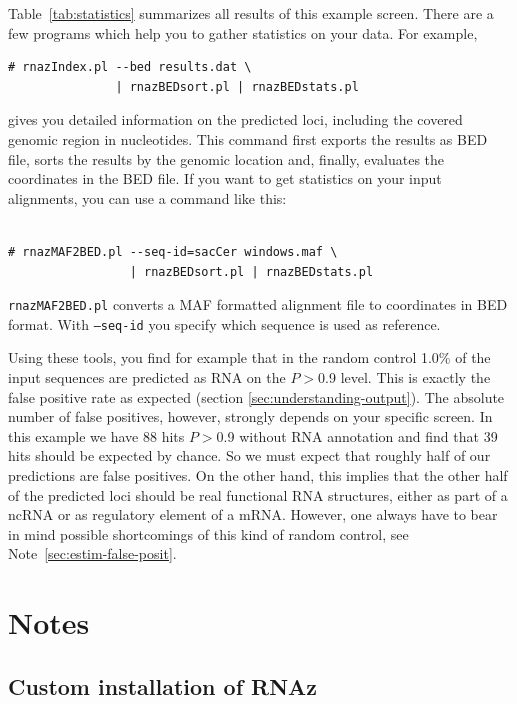\documentclass[11pt]{article}
\begin{document}
Table~\ref{tab:statistics} summarizes all results of this example screen.
There are a few programs which help you to gather statistics on your data.
For example,

\begin{verbatim}
# rnazIndex.pl --bed results.dat \
               | rnazBEDsort.pl | rnazBEDstats.pl
\end{verbatim}

gives you detailed information on the predicted loci, including the covered
genomic region in nucleotides. This command first exports the results as
BED file, sorts the results by the genomic location and, finally, evaluates
the coordinates in the BED file. If you want to get statistics on your
input alignments, you can use a command like this:

\begin{verbatim}

# rnazMAF2BED.pl --seq-id=sacCer windows.maf \
                 | rnazBEDsort.pl | rnazBEDstats.pl

\end{verbatim}

\texttt{rnazMAF2BED.pl} converts a MAF formatted alignment file to
coordinates in BED format. With \texttt{--seq-id} you specify which
sequence is used as reference.

Using these tools, you find for example that in the random control 1.0\% of
the input sequences are predicted as RNA on the $P>$0.9 level. This is
exactly the false positive rate as expected (section
\ref{sec:understanding-output}). The absolute number of false positives,
however, strongly depends on your specific screen. In this example we have
88 hits $P>$0.9 without RNA annotation and find that 39 hits should be
expected by chance. So we must expect that roughly half of our predictions
are false positives. On the other hand, this implies that the other half of
the predicted loci should be real functional RNA structures, either as part
of a ncRNA or as regulatory element of a mRNA. However, one always have to
bear in mind possible shortcomings of this kind of random control, see
Note~\ref{sec:estim-false-posit}.



\section{Notes}

\subsection{Custom installation of RNAz}
\label{sec:cust-inst-rnaz}
\end{document}
